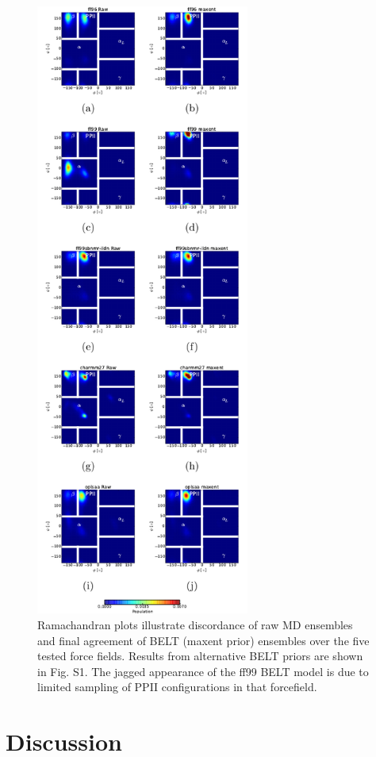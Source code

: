 \documentclass[12pt]{article}
\begin{document}
\begin{figure}

\includegraphics[height=20.25cm]{figure_layouts/figure4.pdf}

\caption{
Ramachandran plots illustrate discordance of raw MD ensembles and final agreement of BELT (maxent prior) ensembles over the five tested force fields. Results from alternative BELT priors are shown in Fig. S1.  The jagged appearance of the ff99 BELT model is due to limited sampling of PPII configurations in that forcefield.  
}
\label{figure:Rama}
\end{figure}

\section*{Discussion}
\end{document}
